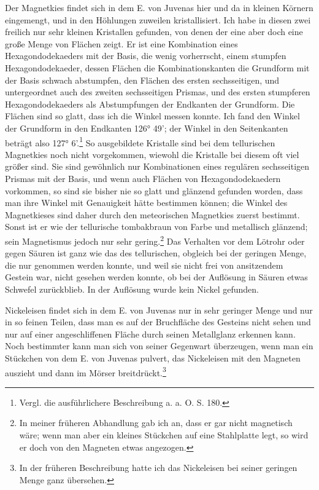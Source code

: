 \documentclass[a4paper, 11pt, oneside]{article}
\begin{document}
Der Magnetkies findet sich in dem E. von Juvenas hier und da in kleinen Körnern eingemengt, und in den Höhlungen zuweilen kristallisiert. Ich habe in diesen zwei freilich nur sehr kleinen Kristallen gefunden, von denen der eine aber doch eine große Menge von Flächen zeigt. Er ist eine Kombination eines Hexagondodekaeders mit der Basis, die wenig vorherrscht, einem stumpfen Hexagondodekaeder, dessen Flächen die Kombinationskanten die Grundform mit der Basis schwach abstumpfen, den Flächen des ersten sechsseitigen, und untergeordnet auch des zweiten sechsseitigen Prismas, und des ersten stumpferen Hexagondodekaeders als Abstumpfungen der Endkanten der Grundform. Die Flächen sind so glatt, dass ich die Winkel messen konnte. Ich fand den Winkel der Grundform in den Endkanten 126° 49’; der Winkel in den Seitenkanten beträgt also 127° 6’.\footnote{Vergl. die ausführlichere Beschreibung a. a. O. S. 180.} So ausgebildete Kristalle sind bei dem tellurischen Magnetkies noch nicht vorgekommen, wiewohl die Kristalle bei diesem oft viel größer sind. Sie sind gewöhnlich nur Kombinationen eines regulären sechsseitigen Prismas mit der Basis, und wenn auch Flächen von Hexagondodekaedern vorkommen, so sind sie bisher nie so glatt und glänzend gefunden worden, dass man ihre Winkel mit Genauigkeit hätte bestimmen können; die Winkel des Magnetkieses sind daher durch den meteorischen Magnetkies zuerst bestimmt. Sonst ist er wie der tellurische tombakbraun von Farbe und metallisch glänzend; sein Magnetismus jedoch nur sehr gering.\footnote{In meiner früheren Abhandlung gab ich an, dass er gar nicht magnetisch wäre; wenn man aber ein kleines Stückchen auf eine Stahlplatte legt, so wird er doch von den Magneten etwas angezogen.} Das Verhalten vor dem Lötrohr oder gegen Säuren ist ganz wie das des tellurischen, obgleich bei der geringen Menge, die nur genommen werden konnte, und weil sie nicht frei von ansitzendem Gestein war, nicht gesehen werden konnte, ob bei der Auflösung in Säuren etwas Schwefel zurückblieb. In der Auflösung wurde kein Nickel gefunden.

Nickeleisen findet sich in dem E. von Juvenas nur in sehr geringer Menge und nur in so feinen Teilen, dass man es auf der Bruchfläche des Gesteins nicht sehen und nur auf einer angeschliffenen Fläche durch seinen Metallglanz erkennen kann. Noch bestimmter kann man sich von seiner Gegenwart überzeugen, wenn man ein Stückchen von dem E. von Juvenas pulvert, das Nickeleisen mit den Magneten auszieht und dann im Mörser breitdrückt.\footnote{In der früheren Beschreibung hatte ich das Nickeleisen bei seiner geringen Menge ganz übersehen.}
\end{document}
